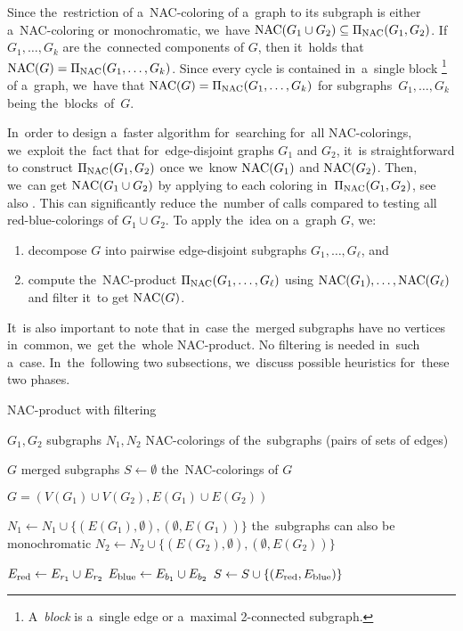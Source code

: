 Since the~restriction of a~NAC-coloring of a~graph
to its subgraph is either a~NAC-coloring or monochromatic,
we~have $\operatorname{NAC}(G_{1} \cup G_{2}) \subseteq \operatorname{\Pi_{\operatorname{NAC}}}(G_{1}, G_{2})$.
If~$G_1, \dots, G_k$ are the~connected components of $G$,
then it~holds that $\operatorname{NAC}(G) = \operatorname{\Pi_{\operatorname{NAC}}}(G_1,\ldots, G_k)$.
Since every cycle is contained in~a~single
block%
\footnote{
	A~\emph{block} is a~single edge or a~maximal 2-connected subgraph.
}
of a~graph, we~have that $\operatorname{NAC}(G) = \operatorname{\Pi_{\operatorname{NAC}}}(G_1,\ldots, G_k)$
for subgraphs~$G_1,\ldots, G_k$ being the~blocks~of~$G$.

In~order to design a~faster algorithm for~searching for~all NAC-colorings,
we~exploit the~fact that for~edge-disjoint graphs $G_1$ and $G_2$,
it~is straightforward to construct $\operatorname{\Pi_{\operatorname{NAC}}}(G_{1}, G_{2})$ once we~know $\operatorname{NAC}(G_1)$ and $\operatorname{NAC}(G_2)$.
Then, we~can get $\operatorname{NAC}(G_{1} \cup G_{2})$ by applying \IsNACColoring{}
to each coloring in~$\operatorname{\Pi_{\operatorname{NAC}}}(G_{1}, G_{2})$, see also .
This can significantly reduce the~number of \IsNACColoring{} calls
compared to testing all red-blue-colorings of $G_{1} \cup G_{2}$.
To apply the~idea on a~graph $G$, we:
%
\begin{enumerate}
	\item decompose $G$ into pairwise edge-disjoint subgraphs $G_1, \ldots, G_\ell$, and
	\item compute the~NAC-product $\operatorname{\Pi_{\operatorname{NAC}}}(G_1, \dots, G_\ell)$ using $\operatorname{NAC}(G_1), \ldots, \operatorname{NAC}(G_\ell)$
	      and filter it~to get $\operatorname{NAC}(G)$.
\end{enumerate}
%
It~is also important to note that in~case the~merged subgraphs
have no vertices in~common, we~get the~whole NAC-product.
No filtering is needed in~such a~case.
%
In~the~following two subsections, we~discuss possible heuristics
for~these two phases.

\begin{algorithm}
	\caption{NAC-product with filtering}%
	\label{alg:coloring_product}
	\begin{algorithmic}[1]
		\Require{} $G_1, G_2$
		\Comment{} subgraphs
		\Require{} $N_1, N_2$
		\Comment{} NAC-colorings of the~subgraphs (pairs of sets of edges)

		\Ensure{} $G$
		\Comment{} merged subgraphs
		\Ensure{} $S \gets \emptyset$
		\Comment{} the~NAC-colorings of $G$

		\State{} $G = (V(G_1)\cup V(G_2), E(G_1) \cup E(G_2))$

		\State{} $N_1 \gets N_1 \cup \{(E(G_1), \emptyset), (\emptyset, E(G_1))\}$
		\Comment{} the~subgraphs can also be monochromatic
		\State{} $N_2 \gets N_2 \cup \{(E(G_2), \emptyset), (\emptyset, E(G_2))\}$

		\State{} $E_{\text{red}} \gets E_{r_{1}} \cup E_{r_{2}}$
		\State{} $E_{\text{blue}} \gets E_{b_{1}} \cup E_{b_{2}}$
		\State{} $S \gets S \cup \{(E_{\text{red}}, E_{\text{blue}})\}$
		\EndIf{}
		\EndFor{}
		\EndFor{}
	\end{algorithmic}
\end{algorithm}

